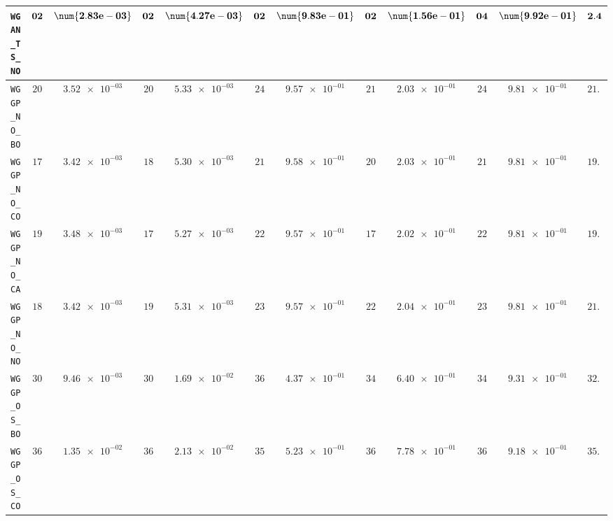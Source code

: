 \begin{table}[H]
\begin{tabularx}{\textwidth}{l||cC|cC|cC|cC|cC||c}
		\texttt{WGAN\_TS\_NO} & $\bf 02$ & $\bf \num{2.83e-03}$ & $\bf 02$ & $\bf \num{4.27e-03}$ & $\bf 02$ & $\bf \num{9.83e-01}$ & $\bf 02$ & $\bf \num{1.56e-01}$ & $\bf 04$ & $\bf \num{9.92e-01}$ & $\bf 2.4$  \\ \hline
		\texttt{WGGP\_NO\_BO} & $ 20$ & $ \num{3.52e-03}$ & $ 20$ & $ \num{5.33e-03}$ & $ 24$ & $ \num{9.57e-01}$ & $ 21$ & $ \num{2.03e-01}$ & $ 24$ & $ \num{9.81e-01}$ & $ 21.8$  \\
		\texttt{WGGP\_NO\_CO} & $ 17$ & $ \num{3.42e-03}$ & $ 18$ & $ \num{5.30e-03}$ & $ 21$ & $ \num{9.58e-01}$ & $ 20$ & $ \num{2.03e-01}$ & $ 21$ & $ \num{9.81e-01}$ & $ 19.4$  \\
		\texttt{WGGP\_NO\_CA} & $ 19$ & $ \num{3.48e-03}$ & $ 17$ & $ \num{5.27e-03}$ & $ 22$ & $ \num{9.57e-01}$ & $ 17$ & $ \num{2.02e-01}$ & $ 22$ & $ \num{9.81e-01}$ & $ 19.4$  \\
		\texttt{WGGP\_NO\_NO} & $ 18$ & $ \num{3.42e-03}$ & $ 19$ & $ \num{5.31e-03}$ & $ 23$ & $ \num{9.57e-01}$ & $ 22$ & $ \num{2.04e-01}$ & $ 23$ & $ \num{9.81e-01}$ & $ 21.0$  \\
		\texttt{WGGP\_OS\_BO} & $ 30$ & $ \num{9.46e-03}$ & $ 30$ & $ \num{1.69e-02}$ & $ 36$ & $ \num{4.37e-01}$ & $ 34$ & $ \num{6.40e-01}$ & $ 34$ & $ \num{9.31e-01}$ & $ 32.8$  \\
		\texttt{WGGP\_OS\_CO} & $ 36$ & $ \num{1.35e-02}$ & $ 36$ & $ \num{2.13e-02}$ & $ 35$ & $ \num{5.23e-01}$ & $ 36$ & $ \num{7.78e-01}$ & $ 36$ & $ \num{9.18e-01}$ & $ 35.8$  \\

\end{tabularx}
\end{table}
